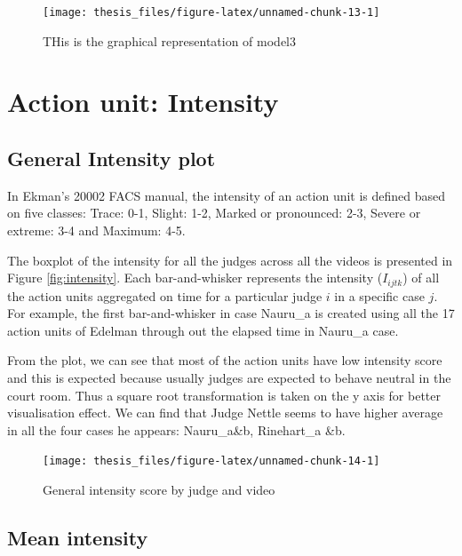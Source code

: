 \documentclass{monashthesis}
\begin{document}
\begin{figure}
\texttt{[image: thesis\_files/figure-latex/unnamed-chunk-13-1]} \caption{THis is the graphical representation of model3\label{fig:model_3_plot}}\label{fig:unnamed-chunk-13}
\end{figure}

\hypertarget{action-unit-intensity}{%
\section{Action unit: Intensity}\label{action-unit-intensity}}

\hypertarget{general-intensity-plot}{%
\subsection{General Intensity plot}\label{general-intensity-plot}}

In Ekman's 20002 FACS manual, the intensity of an action unit is defined based on five classes: Trace: 0-1, Slight: 1-2, Marked or pronounced: 2-3, Severe or extreme: 3-4 and Maximum: 4-5.

The boxplot of the intensity for all the judges across all the videos is presented in Figure \ref{fig:intensity}. Each bar-and-whisker represents the intensity (\(I_{ijtk}\)) of all the action units aggregated on time for a particular judge \(i\) in a specific case \(j\). For example, the first bar-and-whisker in case Nauru\_a is created using all the 17 action units of Edelman through out the elapsed time in Nauru\_a case.

From the plot, we can see that most of the action units have low intensity score and this is expected because usually judges are expected to behave neutral in the court room. Thus a square root transformation is taken on the y axis for better visualisation effect. We can find that Judge Nettle seems to have higher average in all the four cases he appears: Nauru\_a\&b, Rinehart\_a \&b.

\begin{figure}
\texttt{[image: thesis\_files/figure-latex/unnamed-chunk-14-1]} \caption{General intensity score by judge and video\label{fig:intensity}}\label{fig:unnamed-chunk-14}
\end{figure}

\hypertarget{mean-intensity}{%
\subsection{Mean intensity}\label{mean-intensity}}
\end{document}
